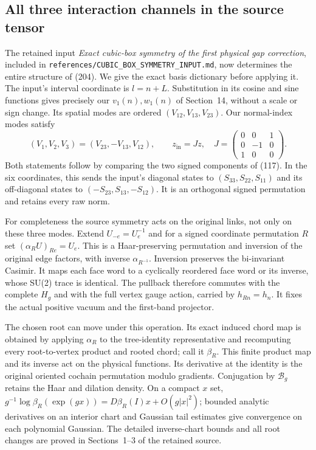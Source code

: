 \documentclass[11pt]{article}
\begin{document}
\subsection{All three interaction channels in the source tensor}

The retained input \emph{Exact cubic-box symmetry of the first
physical gap correction}, included in
\texttt{references/CUBIC\_BOX\_SYMMETRY\_INPUT.md}, now determines
the entire structure of (204). We give the exact
basis dictionary before applying it. The input's interval coordinate
is $l=n+L$. Substitution in its cosine and sine functions gives
precisely our $v_1(n),w_1(n)$ of Section~14, without a scale or sign
change. Its spatial modes are ordered $(V_{12},V_{13},V_{23})$.
Our normal-index modes satisfy
\[
 (V_1,V_2,V_3)=(V_{23},-V_{13},V_{12}),\qquad
 z_{\mathrm{in}}=Jz,\quad
 J=\begin{pmatrix}0&0&1\\0&-1&0\\1&0&0\end{pmatrix}.
\]
Both statements follow by comparing the two signed components of
(117). In the six coordinates, this sends the
input's diagonal states to $(S_{33},S_{22},S_{11})$ and its
off-diagonal states to $(-S_{23},S_{13},-S_{12})$.
It is an orthogonal signed permutation and retains every raw norm.

For completeness the source symmetry acts on the original links,
not only on these three modes. Extend $U_{-e}=U_e^{-1}$ and for a
signed coordinate permutation $R$ set $(\alpha_RU)_{Re}=U_e$.
This is a Haar-preserving permutation and inversion of the original
edge factors, with inverse $\alpha_{R^{-1}}$. Inversion preserves
the bi-invariant Casimir. It maps each face word to a cyclically
reordered face word or its inverse, whose SU(2) trace is identical.
The pullback therefore commutes with the complete $H_g$ and with
the full vertex gauge action, carried by $h_{Rn}=h_n$. It fixes the
actual positive vacuum and the first-band projector.

The chosen root can move under this operation. Its exact induced
chord map is obtained by applying $\alpha_R$ to the tree-identity
representative and recomputing every root-to-vertex product and
rooted chord; call it $\beta_R$. This finite product map and its
inverse act on the physical functions. Its derivative at the
identity is the original oriented cochain permutation modulo
gradients. Conjugation by $\mathcal B_g$ retains the Haar and
dilation density. On a compact $x$ set,
$g^{-1}\log\beta_R(\exp(gx))=D\beta_R(I)x+O(g|x|^2)$;
bounded analytic derivatives on an interior chart and Gaussian
tail estimates give convergence on each polynomial Gaussian.
The detailed inverse-chart bounds and all root changes are proved
in Sections~1--3 of the retained source.
\end{document}
